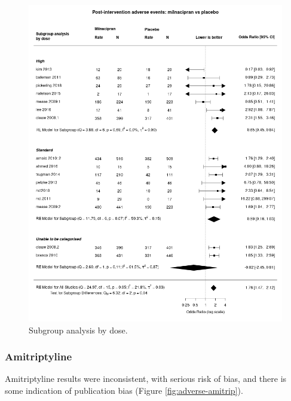 \documentclass{report}\usepackage[]{graphicx}\usepackage[]{color}
\begin{document}
\begin{figure}

\includegraphics[width=\textwidth]{img/adverse-dose-milnacipran-placebo-forest.png}
\caption[adverse by dose: milnacipran]{
Subgroup analysis by dose. 
}
\label{fig:adverse-dose-milna-plac}
\end{figure}

\subsubsection{Amitriptyline}

Amitriptyline results were inconsistent, with serious risk of bias, and there is some indication of publication bias (Figure \ref{fig:adverse-amitrip}).
\end{document}
